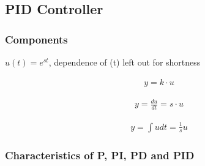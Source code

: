 \subsection{PID Controller}
    \subsubsection{Components}
        $u(t) = e^{st}$, dependence of (t) left out for shortness\\
        \begin{minipage}{0.28\linewidth}
            \begin{align*}
                y = k \cdot u
            \end{align*}
        \end{minipage}
        \begin{minipage}{0.32\linewidth}
            \begin{align*}
                y = \frac{du}{dt} = s \cdot u
            \end{align*}
        \end{minipage}
        \begin{minipage}{0.32\linewidth}
            \begin{align*}
                y = \int u dt = \frac{1}{s} u
            \end{align*}
        \end{minipage}
        \newcolumn
        
    \subsubsection{Characteristics of P, PI, PD and PID}
    
